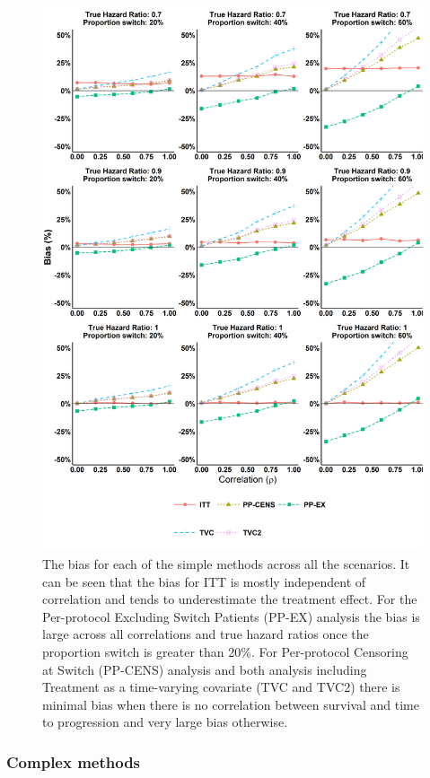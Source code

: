 \begin{figure}[ht]
\centering
\includegraphics[width=13cm]{images/chap_sim2/simple_bias.png}
\caption{\label{F:chap_sim2:simp_bias} The bias for each of the simple methods across all the scenarios. It can be seen that the bias for ITT is mostly independent of correlation and tends to underestimate the treatment effect. For the Per-protocol Excluding Switch Patients (PP-EX) analysis the bias is large across all correlations and true hazard ratios once the proportion switch is greater than 20\%. For Per-protocol Censoring at Switch (PP-CENS) analysis and both analysis including Treatment as a time-varying covariate (TVC and TVC2) there is minimal bias when there is no correlation between survival and time to progression and very large bias otherwise. } 
\end{figure}

\subsubsection{Complex methods}

